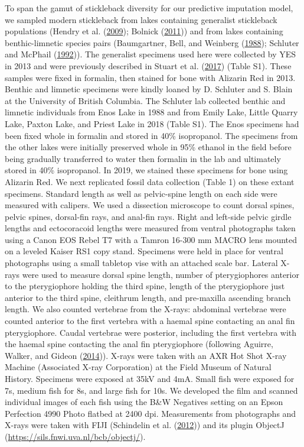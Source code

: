 \documentclass[
  12pt,
]{article}
\begin{document}
To span the gamut of stickleback diversity for our predictive imputation
model, we sampled modern stickleback from lakes containing generalist
stickleback populations (Hendry et al.
(\protect\hyperlink{ref-Hendryetal2009}{2009}); Bolnick
(\protect\hyperlink{ref-Bolnick2011}{2011})) and from lakes containing
benthic-limnetic species pairs (Baumgartner, Bell, and Weinberg
(\protect\hyperlink{ref-Baumgartneretal1988}{1988}); Schluter and
McPhail (\protect\hyperlink{ref-SchluterandMcPhail1992}{1992})). The
generalist specimens used here were collected by YES in 2013 and were
previously described in Stuart et al.
(\protect\hyperlink{ref-Stuartetal2017}{2017}) (Table S1). These samples
were fixed in formalin, then stained for bone with Alizarin Red in 2013.
Benthic and limnetic specimens were kindly loaned by D. Schluter and S.
Blain at the University of British Columbia. The Schluter lab collected
benthic and limnetic individuals from Enos Lake in 1988 and from Emily
Lake, Little Quarry Lake, Paxton Lake, and Priest Lake in 2018 (Table
S1). The Enos specimens had been fixed whole in formalin and stored in
40\% isopropanol. The specimens from the other lakes were initially
preserved whole in 95\% ethanol in the field before being gradually
transferred to water then formalin in the lab and ultimately stored in
40\% isopropanol. In 2019, we stained these specimens for bone using
Alizarin Red. We next replicated fossil data collection (Table 1) on
these extant specimens. Standard length as well as pelvic-spine length
on each side were measured with calipers. We used a dissection
microscope to count dorsal spines, pelvic spines, dorsal-fin rays, and
anal-fin rays. Right and left-side pelvic girdle lengths and
ectocoracoid lengths were measured from ventral photographs taken using
a Canon EOS Rebel T7 with a Tamron 16-300 mm MACRO lens mounted on a
leveled Kaiser RS1 copy stand. Specimens were held in place for ventral
photographs using a small tabletop vise with an attached scale bar.
Lateral X-rays were used to measure dorsal spine length, number of
pterygiophores anterior to the pterygiophore holding the third spine,
length of the pterygiophore just anterior to the third spine, cleithrum
length, and pre-maxilla ascending branch length. We also counted
vertebrae from the X-rays: abdominal vertebrae were counted anterior to
the first vertebra with a haemal spine contacting an anal fin
pterygiophore. Caudal vertebrae were posterior, including the first
vertebra with the haemal spine contacting the anal fin pterygiophore
(following Aguirre, Walker, and Gideon
(\protect\hyperlink{ref-Aguirreetal2014}{2014})). X-rays were taken with
an AXR Hot Shot X-ray Machine (Associated X-ray Corporation) at the
Field Museum of Natural History. Specimens were exposed at 35kV and 4mA.
Small fish were exposed for 7s, medium fish for 8s, and large fish for
10s. We developed the film and scanned individual images of each fish
using the B\&W Negatives setting on an Epson Perfection 4990 Photo
flatbed at 2400 dpi. Measurements from photographs and X-rays were taken
with FIJI (Schindelin et al.
(\protect\hyperlink{ref-Schindelinetal2012}{2012})) and its plugin
ObjectJ (\url{https://sils.fnwi.uva.nl/bcb/objectj/}).
\end{document}
